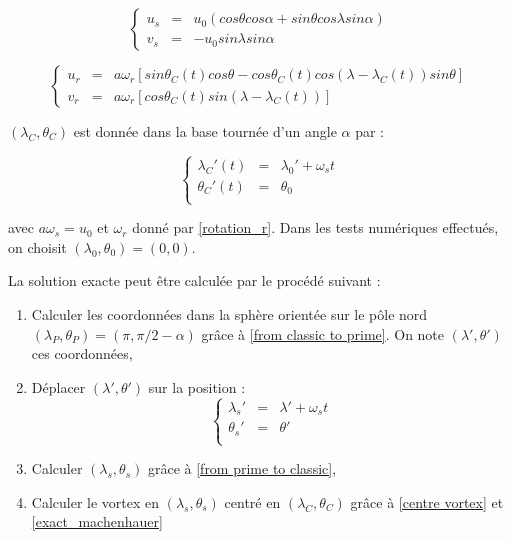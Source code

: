 \begin{equation}
\left\lbrace
\begin{array}{rcl}
u_s & = & u_0 ( cos \theta cos \alpha + sin \theta cos \lambda sin \alpha ) \\
v_s & = & - u_0 sin \lambda sin \alpha 
\end{array}
\right.
\end{equation}

\begin{equation}
\left\lbrace
\begin{array}{rcl}
u_r & = & a \omega_r  \left[ sin \theta_C(t) cos \theta - cos \theta_C(t) cos( \lambda - \lambda_C(t) ) sin \theta \right] \\
v_r & = & a \omega_r  \left[ cos \theta_C(t) sin ( \lambda - \lambda_C(t)) \right]
\end{array}
\right.
\end{equation}

$(\lambda_C, \theta_C)$ est donnée dans la base tournée d'un angle $\alpha$ par :

\begin{equation}
\label{centre vortex}
\left\lbrace
\begin{array}{rcl}
\lambda_C'(t) & = & \lambda_0' + \omega_s t\\
\theta_C'(t) & = & \theta_0 \\
\end{array}
\right.
\end{equation}

avec $a \omega_s = u_0$ et $\omega_r$ donné par \eqref{rotation_r}. Dans les tests numériques effectués, on choisit $(\lambda_0, \theta_0) = (0,0)$.

La solution exacte peut être calculée par le procédé suivant :

\begin{enumerate}
\item Calculer les coordonnées dans la sphère orientée sur le pôle nord $(\lambda_P, \theta_P) = ( \pi, \pi/2 - \alpha)$ grâce à \eqref{from classic to prime}. On note $(\lambda', \theta')$ ces coordonnées,

\item Déplacer $(\lambda', \theta')$ sur la position :
\begin{equation}
\left\lbrace
\begin{array}{rcl}
\lambda_s' & = & \lambda' + \omega_s t\\
\theta_s' & = & \theta' \\
\end{array}
\right.
\end{equation}

\item Calculer $(\lambda_s, \theta_s)$ grâce à \eqref{from prime to classic},

\item Calculer le vortex en $(\lambda_s, \theta_s)$ centré en $(\lambda_C, \theta_C)$ grâce à \eqref{centre vortex} et \eqref{exact_machenhauer}
 
\end{enumerate}

